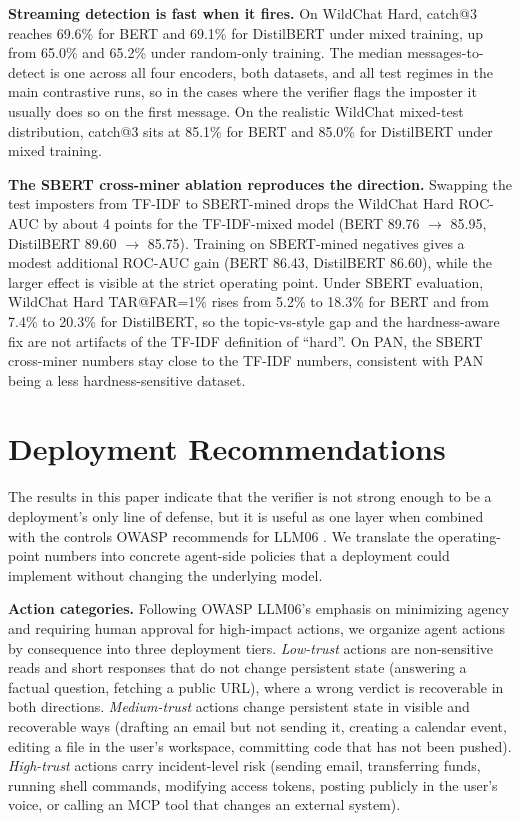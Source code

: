 \documentclass[11pt]{article}
\begin{document}
\noindent\textbf{Streaming detection is fast when it fires.} On WildChat Hard, catch@3 reaches 69.6\% for BERT and 69.1\% for DistilBERT under mixed training, up from 65.0\% and 65.2\% under random-only training. The median messages-to-detect is one across all four encoders, both datasets, and all test regimes in the main contrastive runs, so in the cases where the verifier flags the imposter it usually does so on the first message. On the realistic WildChat mixed-test distribution, catch@3 sits at 85.1\% for BERT and 85.0\% for DistilBERT under mixed training.

\noindent\textbf{The SBERT cross-miner ablation reproduces the direction.} Swapping the test imposters from TF-IDF to SBERT-mined drops the WildChat Hard ROC-AUC by about 4 points for the TF-IDF-mixed model (BERT 89.76 $\rightarrow$ 85.95, DistilBERT 89.60 $\rightarrow$ 85.75). Training on SBERT-mined negatives gives a modest additional ROC-AUC gain (BERT 86.43, DistilBERT 86.60), while the larger effect is visible at the strict operating point. Under SBERT evaluation, WildChat Hard TAR@FAR=1\% rises from 5.2\% to 18.3\% for BERT and from 7.4\% to 20.3\% for DistilBERT, so the topic-vs-style gap and the hardness-aware fix are not artifacts of the TF-IDF definition of ``hard''. On PAN, the SBERT cross-miner numbers stay close to the TF-IDF numbers, consistent with PAN being a less hardness-sensitive dataset.

\section{Deployment Recommendations}
\label{sec:deployment}

The results in this paper indicate that the verifier is not strong enough to be a deployment's only line of defense, but it is useful as one layer when combined with the controls OWASP recommends for LLM06 \citep{owasp2025llm}. We translate the operating-point numbers into concrete agent-side policies that a deployment could implement without changing the underlying model.

\noindent\textbf{Action categories.} Following OWASP LLM06's emphasis on minimizing agency and requiring human approval for high-impact actions, we organize agent actions by consequence into three deployment tiers. \textit{Low-trust} actions are non-sensitive reads and short responses that do not change persistent state (answering a factual question, fetching a public URL), where a wrong verdict is recoverable in both directions. \textit{Medium-trust} actions change persistent state in visible and recoverable ways (drafting an email but not sending it, creating a calendar event, editing a file in the user's workspace, committing code that has not been pushed). \textit{High-trust} actions carry incident-level risk (sending email, transferring funds, running shell commands, modifying access tokens, posting publicly in the user's voice, or calling an MCP tool that changes an external system).
\end{document}
